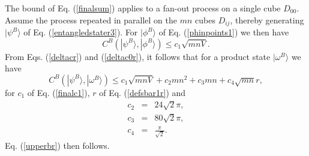\documentclass[12pt,amsmath,amssymb,onecolumn]{revtex4-2}
\begin{document}
The bound of Eq. (\ref{finalsum}) applies to a fan-out process on a 
single cube $D_{00}$. Assume the process repeated in parallel on the
$mn$ cubes $D_{ij}$, thereby generating $|\psi^B \rangle $ of Eq. (\ref{entangledstater3}).
For $|\phi^B \rangle $ of Eq. (\ref{phinpoints1}) we then have
\begin{equation}
\label{psiphir}
C^B( |\psi^B \rangle , |\phi^B \rangle ) \le  c_1 \sqrt{mnV}.
\end{equation}
From Eqs. (\ref{deltacr}) and (\ref{deltac0r}), it follows that for a product state
$|\omega^B \rangle $ we have
\begin{equation}
\label{psiomegar}
C^B(|\psi^B \rangle ,|\omega^B \rangle ) \le c_1 \sqrt{ mnV} + c_2 m n^2 + c_3 mn + c_4\sqrt{mn} r, 
\end{equation}
for $c_1$ of Eq. (\ref{finalc1}), $r$ of  Eq. (\ref{defsbar1r}) and 
\begin{subequations}
\begin{eqnarray}
\label{defc2r}
c_2 & = & 24 \sqrt{2} \pi, \\
\label{defc21r}
c_3 & = & 80 \sqrt{2} \pi, \\
\label{defc32r}
c_4 & = & \frac{\pi}{\sqrt{2}}.
\end{eqnarray}
\end{subequations}
Eq. (\ref{upperbr}) then follows.
\end{document}
